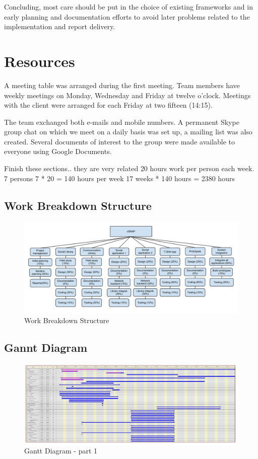 Concluding, most care should be put in the choice of existing frameworks and in early planning
and documentation efforts to avoid later problems related to the implementation and report delivery.

\newpage
\section{Resources}
A meeting table was arranged during the first meeting. Team members
have weekly meetings on Monday, Wednesday and Friday at twelve o'clock.
Meetings with the client were arranged for each Friday at two fifteen (14:15).

The team exchanged both e-mails and mobile numbers. A permanent Skype
group chat on which we meet on a daily basis was set up, a mailing
list was also created. Several documents of interest to the group
were made available to everyone using Google Documents.

\todo
{
 Finish these sections.. they are very related
}
20 hours work per person each week.
7 persons
7 * 20 = 140 hours per week
17 weeks * 140 hours = 2380 hours

\subsection{Work Breakdown Structure}

\begin{figure}[h]
\centering \includegraphics[width=1.1\textwidth]{img/mgmt-wbs.pdf} \caption{Work Breakdown Structure}
\label{fig:mgmt-wbs}
\end{figure}

\subsection{Gannt Diagram}

\begin{figure}[h]
\centering \includegraphics[angle=270, width=1\textwidth, trim=0mm 0mm 47.5cm 0mm, clip]{img/mgmt-gantt.pdf} \caption{Gantt Diagram - part 1}
\label{fig:mgmt-gantt-1}
\end{figure}

